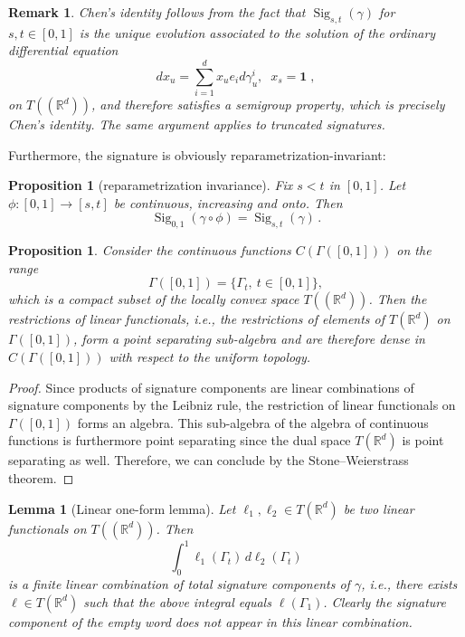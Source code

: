 \documentclass[10pt,a4paper]{amsart}
\newtheorem{proposition}[theorem]{Proposition}
\newtheorem{lemma}[theorem]{Lemma}
\newtheorem{remark}[theorem]{Remark}
\newcommand{\R}{\mathbb{R}}
\newcommand{\Sig}{\operatorname{Sig}}
\newcommand{\id}{\mathbf{1}}
\begin{document}
\begin{remark}
Chen's identity follows from the fact that $\Sig_{s,t}(\gamma)$ for $ s, t \in [0,1]$ is the unique evolution associated to the solution of the ordinary differential equation
$$
d x_u = \sum_{i=1}^d x_u e_i d\gamma^i_u, \; \;   x_s = \id  \;,
$$
on $T((\mathbb{R}^d))$, and  therefore satisfies a semigroup property, which is precisely Chen's identity. The same argument applies to truncated signatures.
\end{remark}

Furthermore, the signature is obviously reparametrization-invariant:

\begin{proposition}[reparametrization invariance]\label{prop:reparam}
Fix $ s < t $ in $[0,1]$. Let $\phi:[0,1]\to[s,t]$ be continuous, increasing and onto. Then
\[
  \Sig_{0,1}(\gamma\circ\phi)=\Sig_{s,t}(\gamma) \, .
\]
\end{proposition}

\begin{proposition}\label{prop:SW}
Consider the continuous functions $C(\Gamma([0,1]))$ on the range 
\begin{equation}\label{eq:SigRange}
    \Gamma([0,1]) = \{\Gamma_t, \ t \in [0,1]\}, 
\end{equation}
which is a compact subset of the locally convex space $T((\R^d))$. Then the restrictions of linear functionals, i.e., the restrictions of elements of $T(\mathbb{R}^d)$ on $\Gamma([0,1])$,  form a point separating sub-algebra and are therefore dense in $C(\Gamma([0,1]))$ with respect to the uniform topology. 
\end{proposition}


\begin{proof}
Since products of signature components are linear combinations of signature components by the Leibniz rule, the restriction of linear functionals on $\Gamma([0,1])$ forms an algebra. This sub-algebra of the algebra of continuous functions is furthermore point separating since the dual space $T(\R^d)$ is point separating as well. Therefore, we can conclude by the Stone--Weierstrass theorem. 
\end{proof}

\begin{lemma}[Linear one-form lemma]\label{lem:polynomial-one-form}
Let $ \ell_1, \ell_2 \in T(\mathbb{R}^d) $ be two linear functionals on $T((\mathbb{R}^d))$. Then
\[
  \int_0^1 \ell_1(\Gamma_t)\,d \ell_2(\Gamma_t)
\]
is a finite linear combination of total signature components of $ \gamma $, i.e., there exists $ \ell \in T(\mathbb{R}^d)$ such that the above integral equals $\ell(\Gamma_1)$. Clearly the signature component of the empty word does not appear in this linear combination.
\end{lemma}
\end{document}
